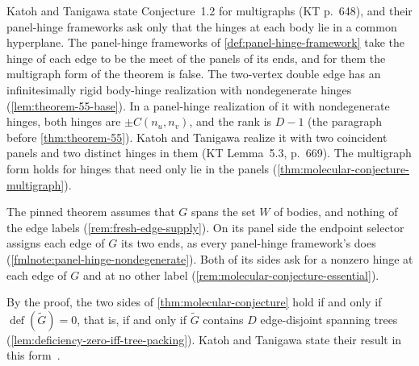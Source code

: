 \begin{fmlnote}
  \label{fmlnote:molecular-conjecture-multigraph}
  Katoh and Tanigawa state Conjecture~1.2 for multigraphs (KT p.~648), and
  their panel-hinge frameworks ask only that the hinges at each body lie
  in a common hyperplane. The panel-hinge frameworks of
  \cref{def:panel-hinge-framework} take the hinge of each edge to be the
  meet of the panels of its ends, and for them the multigraph form of the
  theorem is false. The two-vertex double edge has an infinitesimally
  rigid body-hinge realization with nondegenerate hinges
  (\cref{lem:theorem-55-base}). In a panel-hinge realization of it
  with nondegenerate hinges, both hinges are $\pm C(n_u, n_v)$, and the
  rank is $D - 1$ (the paragraph before \cref{thm:theorem-55}). Katoh and
  Tanigawa realize it with two coincident panels and two distinct hinges
  in them (KT Lemma~5.3, p.~669). The multigraph form holds for hinges that
  need only lie in the panels (\cref{thm:molecular-conjecture-multigraph}).

  The pinned theorem assumes that $G$ spans the set $W$ of bodies, and
  nothing of the edge labels (\cref{rem:fresh-edge-supply}). On its panel
  side
  the endpoint selector assigns each edge of $G$ its two ends, as every
  panel-hinge framework's does (\cref{fmlnote:panel-hinge-nondegenerate}).
  Both of its sides ask for a nonzero hinge at each edge of $G$ and at no
  other label (\cref{rem:molecular-conjecture-essential}).
\end{fmlnote}

By the proof, the two sides of \cref{thm:molecular-conjecture} hold if and
only if $\operatorname{def}(\tilde G) = 0$, that is, if and only if
$\tilde G$ contains $D$ edge-disjoint spanning trees
(\cref{lem:deficiency-zero-iff-tree-packing}). Katoh and Tanigawa state
their result in this form~\cite[p.~647]{katohTanigawa2011}.


